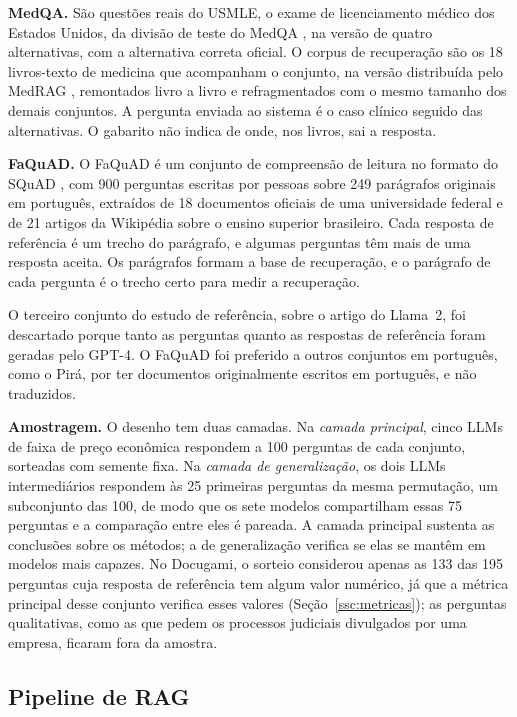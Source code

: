 \textbf{MedQA.} São questões reais do USMLE, o exame de licenciamento médico dos Estados Unidos, da divisão de teste do MedQA \cite{jin2021medqa}, na versão de quatro alternativas, com a alternativa correta oficial. O corpus de recuperação são os 18 livros-texto de medicina que acompanham o conjunto, na versão distribuída pelo MedRAG \cite{xiong2024mirage}, remontados livro a livro e refragmentados com o mesmo tamanho dos demais conjuntos. A pergunta enviada ao sistema é o caso clínico seguido das alternativas. O gabarito não indica de onde, nos livros, sai a resposta.

\textbf{FaQuAD.} O FaQuAD \cite{sayama2019faquad} é um conjunto de compreensão de leitura no formato do SQuAD \cite{rajpurkar2016squad}, com 900 perguntas escritas por pessoas sobre 249 parágrafos originais em português, extraídos de 18 documentos oficiais de uma universidade federal e de 21 artigos da Wikipédia sobre o ensino superior brasileiro. Cada resposta de referência é um trecho do parágrafo, e algumas perguntas têm mais de uma resposta aceita. Os parágrafos formam a base de recuperação, e o parágrafo de cada pergunta é o trecho certo para medir a recuperação.

O terceiro conjunto do estudo de referência, sobre o artigo do Llama~2, foi descartado porque tanto as perguntas quanto as respostas de referência foram geradas pelo GPT-4. O FaQuAD foi preferido a outros conjuntos em português, como o Pirá, por ter documentos originalmente escritos em português, e não traduzidos.

\textbf{Amostragem.} O desenho tem duas camadas. Na \emph{camada principal}, cinco LLMs de faixa de preço econômica respondem a 100 perguntas de cada conjunto, sorteadas com semente fixa. Na \emph{camada de generalização}, os dois LLMs intermediários respondem às 25 primeiras perguntas da mesma permutação, um subconjunto das 100, de modo que os sete modelos compartilham essas 75 perguntas e a comparação entre eles é pareada. A camada principal sustenta as conclusões sobre os métodos; a de generalização verifica se elas se mantêm em modelos mais capazes. No Docugami, o sorteio considerou apenas as 133 das 195 perguntas cuja resposta de referência tem algum valor numérico, já que a métrica principal desse conjunto verifica esses valores (Seção~\ref{ssc:metricas}); as perguntas qualitativas, como as que pedem os processos judiciais divulgados por uma empresa, ficaram fora da amostra.

\subsection{Pipeline de RAG}

